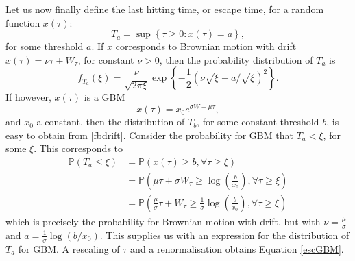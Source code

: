 \documentclass[useAMS]{mn2e}
\begin{document}
\begin{appendix}
Let us now finally define the last hitting time, or escape time, for a
random function $x(\tau)$:
\begin{equation}
T_{a}=\sup\left\{\tau\geq0:x(\tau)=a\right\},
\label{Eqn::BMD_ET}
\end{equation}
for some threshold $a$.
If $x$ corresponds to Brownian motion with drift 
$x(\tau)=\nu\tau+W_\tau$, for constant $\nu>0$, then the probability
distribution of $T_a$ is
\begin{equation}\label{fbdrift}
f_{T_{a}}(\xi)=\frac{\nu}{\sqrt{2\pi \xi}}
\exp\left\{-\frac{1}{2}\left(\nu\sqrt{\xi}-a/\sqrt{\xi}\right)^{2}\right\}. 
\end{equation}
If however, $x(\tau)$ is a GBM
\begin{equation}
x(\tau)=x_{0}e^{\sigma W+\mu \tau},
\end{equation}
and $x_{0}$ a constant, then the distribution of $T_b$, for some
constant threshold $b$, is easy to
obtain from \eqref{fbdrift}. Consider the probability for GBM that
$T_a< \xi$, for some $\xi$. This corresponds to
\begin{align*}
\mathbb{P}(T_a\leq \xi)&=\mathbb{P}\left(x(\tau)\geq b, \forall \tau\geq \xi\right) \\
&= \mathbb{P}\left(\mu \tau +\sigma W_{\tau}\geq \log\left(\frac{b}{x_{0}}\right), \forall \tau\geq \xi\right) \\
&= \mathbb{P}\left(\frac{\mu}{\sigma} \tau +W_\tau\geq
  \frac{1}{\sigma}\log\left(\frac{b}{x_{0}}\right),
  \forall \tau\geq \xi\right)
\end{align*}
which is precisely the probability for Brownian motion with drift, but with
 $\nu=\frac{\mu}{\sigma}$ and $a=\frac{1}{\sigma}\log(b/x_{0})$. This
 supplies us with an expression for the distribution of $T_{a}$ for
 GBM. A rescaling of $\tau$ and a renormalisation obtains Equation \eqref{escGBM}.

\end{appendix}
\end{document}
